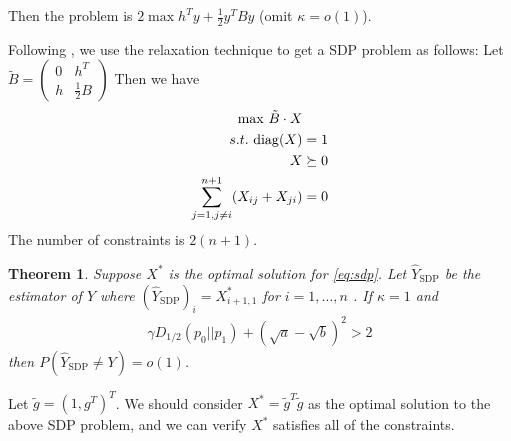 \documentclass{article}
\DeclareMathOperator{\SDP}{SDP}
\newtheorem{theorem}{Theorem}
\DeclareMathOperator{\diag}{diag}
\begin{document}
Then the problem is $2\max h^T y + \frac{1}{2}y^T B y$ (omit $\kappa=o(1)$).

Following \cite{wang2019tightness}, we use the relaxation
technique to get a SDP problem as follows:
Let $\tilde{B} = \begin{pmatrix} 0 & h^T \\ h & \frac{1}{2}B \end{pmatrix}$
Then we have
\begin{align}
\max\, \tilde{B} \cdot X  &\notag\\
s.t.\, \diag(X) &= 1 \notag\\
 X &\succeq 0 \notag\\
 \sum_{j=1, j\neq i}^{n+1} (X_{ij} + X_{ji})& = 0 \label{eq:sdp}
\end{align}
The number of constraints is $2(n+1)$.

\begin{theorem}\label{thm:sdp}
	Suppose $X^*$ is the optimal solution for \eqref{eq:sdp}.
	Let $\hat{Y}_{\SDP}$ be the estimator of $Y$ where  $(\hat{Y}_{\SDP})_i = X^*_{i+1, 1}$ for $i=1,\dots, n$ .
	If $\kappa = 1$
	and
	\begin{align}
	\gamma D_{1/2}(p_0||p_1) + (\sqrt{a} - \sqrt{b})^2 > 2 
	\end{align}
	then $P(\hat{Y}_{\SDP} \neq  Y) = o(1)$.
\end{theorem}

Let $\tilde{g} = (1,g^T)^T$.
We should consider $X^*=\tilde{g}^T \tilde{g}$
as the optimal solution to the above SDP problem, and we can verify $X^*$ satisfies all of the
constraints.
\end{document}
